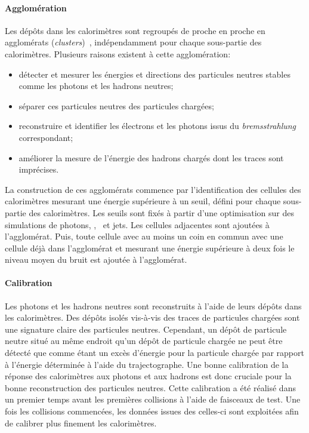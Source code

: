\paragraph{Agglomération}
Les dépôts dans les calorimètres sont regroupés de proche en proche en agglomérats (\emph{clusters})~\cite{particle-flow}, indépendamment pour chaque sous-partie des calorimètres.
Plusieurs raisons existent à cette agglomération:
\begin{itemize}
\item détecter et mesurer les énergies et directions des particules neutres stables comme les photons et les hadrons neutres;
\item séparer ces particules neutres des particules chargées;
\item reconstruire et identifier les électrons et les photons issus du \emph{bremsstrahlung} correspondant;
\item améliorer la mesure de l'énergie des hadrons chargés dont les traces sont imprécises.
\end{itemize}
\par La construction de ces agglomérats commence par l'identification des cellules des calorimètres mesurant une énergie supérieure à un seuil, défini pour chaque sous-partie des calorimètres.
Les seuils sont fixés à partir d'une optimisation sur des simulations de photons, \pionnull, \Kaonnull\ et jets.
Les cellules adjacentes sont ajoutées à l'agglomérat.
Puis, toute cellule avec au moins un coin en commun avec une cellule déjà dans l'agglomérat et mesurant une énergie supérieure à deux fois le niveau moyen du bruit est ajoutée à l'agglomérat.
\paragraph{Calibration}
Les photons et les hadrons neutres sont reconstruits à l'aide de leurs dépôts dans les calorimètres.
Des dépôts isolés vis-à-vis des traces de particules chargées sont une signature claire des particules neutres.
Cependant, un dépôt de particule neutre situé au même endroit qu'un dépôt de particule chargée ne peut être détecté que comme étant un excès d'énergie pour la particule chargée par rapport à l'énergie déterminée à l'aide du trajectographe.
Une bonne calibration de la réponse des calorimètres aux photons et aux hadrons est donc cruciale pour la bonne reconstruction des particules neutres.
Cette calibration a été réalisé dans un premier temps avant les premières collisions à l'aide de faisceaux de test.
Une fois les collisions commencées, les données issues des celles-ci sont exploitées afin de calibrer plus finement les calorimètres.
